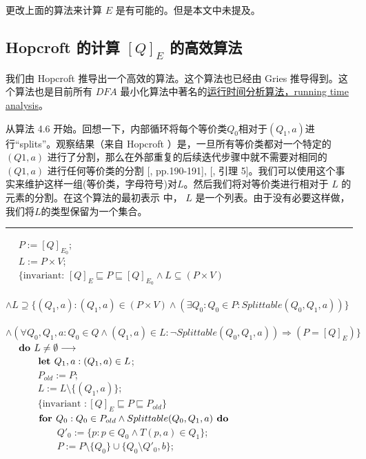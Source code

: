 更改上面的算法来计算 $E$ 是有可能的。但是本文中未提及。

\subsection{Hopcroft 的计算 $[Q]_E$ 的高效算法}

我们由 Hopcroft 推导出一个高效的算法。这个算法也已经由 Gries \cite{Grie73} 推导得到。这个算法也是目前所有 $DFA$ 最小化算法中著名的\uline{运行时间分析算法，running time analysis}。

从算法 4.6 开始。回想一下，内部循环将每个等价类$Q_0$相对于$(Q_1, a)$进行“splits”。观察结果（来自 Hopcroft ）是，一旦所有等价类都对一个特定的 $(Q1,a)$ 进行了分割，那么在外部重复的后续迭代步骤中就不需要对相同的$(Q1,a)$ 进行任何等价类的分割 [\cite{Hopc71}, pp.190-191], [\cite{Grie73}, 引理 5]。我们可以使用这个事实来维护这样一组(等价类，字母符号)对$L$。然后我们将对等价类进行相对于 $L$ 的元素的分割。在这个算法的最初表示 \cite{Hopc71, Grie73} 中， $L$ 是一个列表。由于没有必要这样做，我们将$L$的类型保留为一个集合。
\\
\rule{\textwidth}{1pt}
\mbox{　} $P:=[Q]_{E_0}$; \\
\mbox{　} $L:=P\times V$; \\
\mbox{　} $ \{ \mbox{invariant: } [Q]_E \sqsubseteq P \sqsubseteq [Q]_{E_0} \land L \subseteq (P \times V) $ \\
\mbox{　　　} $ \land L \supseteq  \{ (Q_1,a) : (Q_1,a) \in (P \times V) \land ( \exists Q_0 : Q_0 \in P : Splittable (Q_0,Q_1,a) ) \} $ \\
\mbox{　　　} $ \land (\forall Q_0,Q_1,a:Q_0 \in Q \land (Q_1,a) \in L : \neg Splittable (Q_0,Q_1,a)) \Rightarrow (P=[Q]_E) \} $ \\
\mbox{　} $ \mbox{\textbf{do }} L \not= \emptyset \longrightarrow $ \\ 
\mbox{　　　} $ \mbox{\textbf{let }} Q_1,a:(Q_1,a) \in L $; \\
\mbox{　　　} $ P_{old} := P $; \\
\mbox{　　　} $ L := L \setminus \{ (Q_1,a) \} $; \\
\mbox{　　　} $ \{  \mbox{invariant }: [Q]_E \sqsubseteq P \sqsubseteq P_{old} \} $ \\
\mbox{　　　} $ \mbox{\textbf{for }} Q_0 : Q_0 \in P_{old} \land Splittable (Q_0,Q_1,a) \mbox{\textbf{ do }} $ \\
\mbox{　　　　　} $ Q'_0 := \{ p:p \in Q_0 \land T(p,a) \in Q_1 \} $; \\
\mbox{　　　　　} $ P:= P \setminus \{ Q_0 \} \cup \{ Q_0 \setminus Q'_0,b \} $;\\
